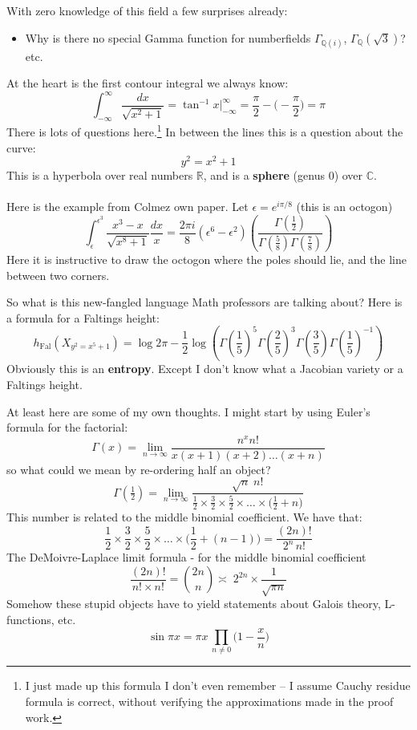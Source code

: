 \documentclass[12pt]{article}
\begin{document}
\newpage

\noindent With zero knowledge of this field a few surprises already:
\begin{itemize}
	\item Why is there no special Gamma function for numberfields $\Gamma_{\mathbb{Q}(i)}$, $\Gamma_\mathbb{Q}(\sqrt{3})$? etc.
\end{itemize}
At the heart is the first contour integral we always know:
$$  \int_{-\infty}^\infty \frac{dx}{\sqrt{x^2 + 1}} = \tan^{-1} x \bigg|^\infty_{-\infty} = \frac{\pi}{2} - \bigg(-\frac{\pi}{2} \bigg) = \pi $$
There is lots of questions here.\footnote{ I just made up this formula I don't even remember -- I assume Cauchy residue formula is correct, without verifying the approximations made in the proof work.}  In between the lines this is a question about the curve:
$$ y^2 = x^2 + 1 $$
This is a hyperbola over real numbers $\mathbb{R}$, and is a \textbf{sphere} (genus 0) over $\mathbb{C}$. \\ \\ 
Here is the example from Colmez own paper.  Let $\epsilon = e^{i\pi/8}$ (this is an {\color{green!80!white}octogon})
$$ \int_\epsilon^{\epsilon^3} \frac{x^3 - x}{\sqrt{x^8 + 1}} \frac{dx}{x} = \frac{2\pi i}{8} (\epsilon^6 - \epsilon^2) \left( \frac{\Gamma(\frac{1}{2})}{
\Gamma(\frac{5}{8})\Gamma(\frac{7}{8})} \right)$$
Here it is instructive to draw the octogon where the poles should lie, and the line between two corners. 
\newpage

\noindent So what is this new-fangled language Math professors are talking about?  Here is a formula for a Faltings height:
$$ h_\text{Fal}( X_{y^2 = x^5 + 1})
= \log 2\pi - \frac{1}{2} \log \left(
\Gamma(\frac{1}{5})^5
\Gamma(\frac{2}{5})^3
\Gamma(\frac{3}{5})
\Gamma(\frac{1}{5})^{-1} \right) $$
Obviously this is an \textbf{entropy}.  Except I don't know what a Jacobian variety or a Faltings height.

\newpage

\noindent At least here are some of my own thoughts.  I might start by using Euler's formula for the factorial:
$$ \Gamma(x) = \lim_{n \to \infty} \frac{n^x n!}{x(x+1)(x+2)\dots (x+n)} $$
so what could we mean by re-ordering half an object?
$$\Gamma(\tfrac{1}{2}) = \lim_{n \to \infty}
\frac{ \sqrt{n} \;n!}{ \frac{1}{2} \times \frac{3}{2} \times \frac{5}{2} \times \dots \times \big(\frac{1}{2}+n\big)} $$
This number is related to the middle binomial coefficient.  We have that:
$$
\frac{1}{2} \times \frac{3}{2} \times \frac{5}{2} \times \dots \times \bigg( \frac{1}{2}+(n-1) \bigg)
= \frac{(2n)!}{2^n \, n!}
 $$
The DeMoivre-Laplace limit formula - for the middle binomial coefficient 
$$ \frac{(2n)!}{n! \times n!} =  \binom{2n}{n} \asymp
\; 2^{2n} \times \frac{1}{ \sqrt{\pi n}} $$
Somehow these stupid objects have to yield statements about Galois theory, L-functions, etc.
$$ \sin \pi x = \pi x\, \prod_{n \neq 0} \bigg(1 - \frac{x}{n}\bigg) $$
\newpage
\end{document}
